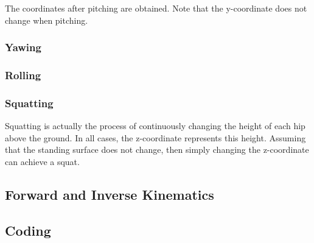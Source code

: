 The coordinates after pitching are obtained. Note that the y-coordinate does not change when pitching.

\subsubsection{Yawing}



\subsubsection{Rolling}



\subsubsection{Squatting}

Squatting is actually the process of continuously changing the height of each hip above the ground. In all cases, the z-coordinate represents this height. Assuming that the standing surface does not change, then simply changing the z-coordinate can achieve a squat.

\subsection{Forward and Inverse Kinematics}



\subsection{Coding}


